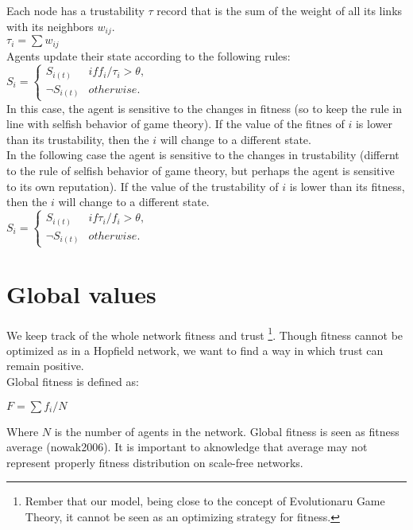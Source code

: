\documentclass[11pt]{article}
\begin{document}
Each node has a trustability $\tau$ record that is the sum of the weight of all its links with its neighbors $w_{ij}$.\\

$\tau_{i} = \sum w_{ij}$\\

Agents update their state according to the following rules:\\

$S_{i} = \begin{cases} S_{i(t)} & if  f_{i}/\tau_{i} > \theta,\\
\neg S_{i(t)} &  otherwise. \end{cases} $\\

In this case, the agent is sensitive to the changes in fitness (so to keep the rule in line with selfish behavior of game theory). If the value of the fitnes of $i$ is lower than its trustability, then the $i$ will change to a different state.\\

In the following case the agent is sensitive to the changes in trustability (differnt to the rule of selfish behavior of game theory, but perhaps the agent is sensitive to its own reputation). If the value of the trustability of $i$ is lower than its fitness, then the $i$ will change to a different state.\\

$S_{i} = \begin{cases} S_{i(t)} & if  \tau_{i}/f_{i} > \theta,\\
\neg S_{i(t)} &  otherwise. \end{cases} $\\

\section{Global values}

We keep track of the whole network fitness and trust \footnote{Rember that our model, being close to the concept of Evolutionaru Game Theory, it cannot be seen as an optimizing strategy for fitness.}. Though fitness cannot be optimized as in a Hopfield network, we want to find a way in which trust can remain positive.\\

Global fitness is defined as:

$F = \sum f_{i}/N$

Where $N$ is the number of agents in the network. Global fitness is seen as fitness average (nowak2006). It is important to aknowledge that average may not represent properly fitness distribution on scale-free networks.\\
\end{document}
